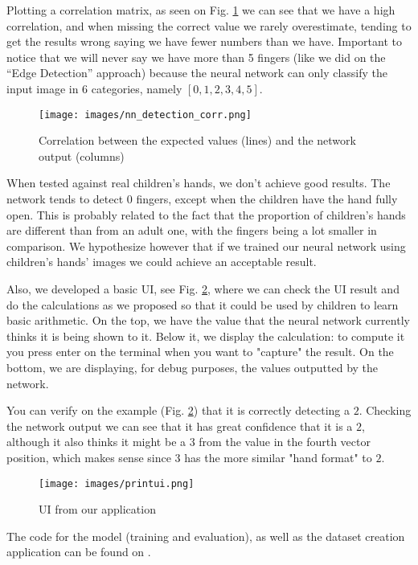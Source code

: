 \documentclass[conference]{IEEEtran}
\begin{document}
Plotting a correlation matrix, as seen on Fig. \ref{finnger_covariance} we can see that we have a high correlation, and when missing the correct value we rarely overestimate, tending to get the results wrong saying we have fewer numbers than we have. Important to notice that we will never say we have more than 5 fingers (like we did on the ``Edge Detection'' approach) because the neural network can only classify the input image in 6 categories, namely $[0, 1, 2, 3, 4, 5]$.

\begin{figure}[htbp]
\centerline{\texttt{[image: images/nn\_detection\_corr.png]}}
\caption{Correlation between the expected values (lines) and the network output (columns)}
\label{finnger_covariance}
\end{figure}

When tested against real children's hands, we don't achieve good results. The network tends to detect $0$ fingers, except when the children have the hand fully open. This is probably related to the fact that the proportion of children's hands are different than from an adult one, with the fingers being a lot smaller in comparison. We hypothesize however that if we trained our neural network using children's hands' images we could achieve an acceptable result.

Also, we developed a basic UI, see Fig. \ref{app_ui}, where we can check the UI result and do the calculations as we proposed so that it could be used by children to learn basic arithmetic. On the top, we have the value that the neural network currently thinks it is being shown to it. Below it, we display the calculation: to compute it you press enter on the terminal when you want to "capture" the result. On the bottom, we are displaying, for debug purposes, the values outputted by the network.

You can verify on the example (Fig. \ref{app_ui}) that it is correctly detecting a $2$. Checking the network output we can see that it has great confidence that it is a $2$, although it also thinks it might be a $3$ from the value in the fourth vector position, which makes sense since $3$ has the more similar "hand format" to $2$.

\begin{figure}[htbp]
\centerline{\texttt{[image: images/printui.png]}}
\caption{UI from our application}
\label{app_ui}
\end{figure}

The code for the model (training and evaluation), as well as the dataset creation application can be found on \cite{github_code}.
\end{document}

